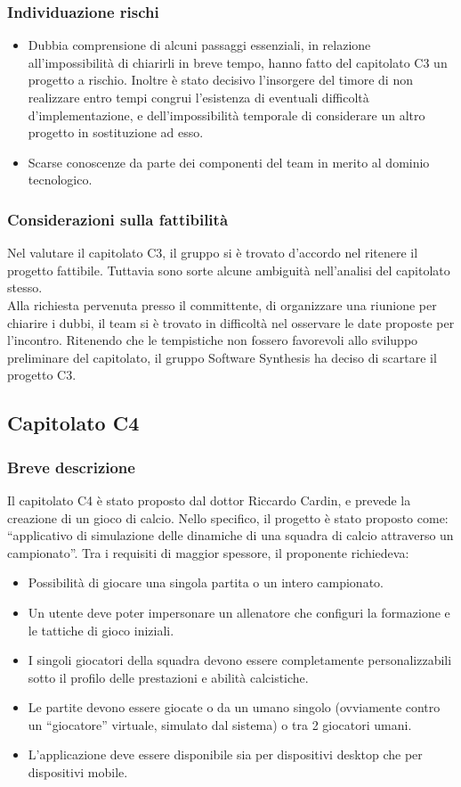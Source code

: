 \subsubsection{Individuazione rischi}
\begin{itemize}
	\item Dubbia comprensione di alcuni passaggi essenziali, in relazione all'impossibilità di chiarirli in breve tempo, hanno fatto del capitolato C3 un progetto a rischio. Inoltre è stato decisivo l'insorgere del timore di non realizzare entro tempi congrui l'esistenza di eventuali difficoltà d'implementazione, e dell'impossibilità temporale di considerare un altro progetto in sostituzione ad esso.
	\item Scarse conoscenze da parte dei componenti del team in merito al dominio tecnologico.
\end{itemize}

\subsubsection{Considerazioni sulla fattibilità}
Nel valutare il capitolato C3, il gruppo si è trovato d'accordo nel ritenere il progetto fattibile. Tuttavia sono sorte alcune ambiguità nell'analisi del capitolato stesso.\\ Alla richiesta pervenuta presso il committente, di organizzare una riunione per chiarire i dubbi, il team si è trovato in difficoltà nel osservare le date proposte per l'incontro. Ritenendo che le tempistiche non fossero favorevoli allo sviluppo preliminare del capitolato, il gruppo Software Synthesis ha deciso di scartare il progetto C3.

\subsection{Capitolato C4}
\subsubsection{Breve descrizione}
Il capitolato C4 è stato proposto dal dottor Riccardo Cardin, e prevede la creazione di un gioco di calcio. Nello specifico, il progetto è stato proposto come: ``applicativo di simulazione delle dinamiche di una squadra di calcio attraverso un campionato''. Tra i requisiti di maggior spessore, il proponente richiedeva:
\begin{itemize}
	\item Possibilità di giocare una singola partita o un intero campionato.
	\item Un utente deve poter impersonare un allenatore che configuri la formazione e le tattiche di gioco iniziali.
	\item I singoli giocatori della squadra devono essere completamente personalizzabili sotto il profilo delle prestazioni e abilità calcistiche.
	\item Le partite devono essere giocate o da un umano singolo (ovviamente contro un ``giocatore'' virtuale, simulato dal sistema) o tra 2 giocatori umani.
	\item L'applicazione deve essere disponibile sia per dispositivi desktop che per dispositivi mobile.
\end{itemize}
